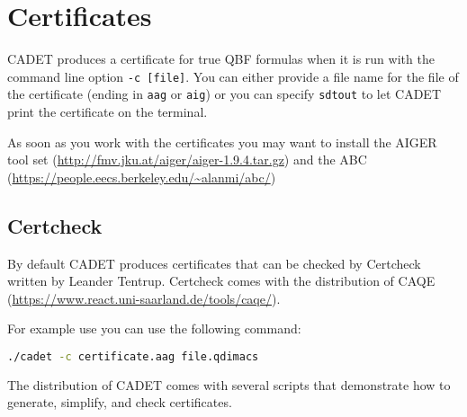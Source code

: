 \documentclass{article}
\begin{document}
%

\section{Certificates}

CADET produces a certificate for true QBF formulas when it is run with the command line option \texttt{-c [file]}. 
You can either provide a file name for the file of the certificate (ending in \texttt{aag} or \texttt{aig}) or you can specify \texttt{sdtout} to let CADET print the certificate on the terminal. 

As soon as you work with the certificates you may want to install the AIGER tool set (\url{http://fmv.jku.at/aiger/aiger-1.9.4.tar.gz}) and the ABC (\url{https://people.eecs.berkeley.edu/~alanmi/abc/})

\subsection{Certcheck}
By default CADET produces certificates that can be checked by Certcheck written by Leander Tentrup. 
Certcheck comes with the distribution of CAQE (\url{https://www.react.uni-saarland.de/tools/caqe/}). 

For example use you can use the following command:
\begin{lstlisting}[language = bash,
				   basicstyle=\footnotesize\ttfamily,
                   xleftmargin = 1cm,
                   framexleftmargin = 1em]
./cadet -c certificate.aag file.qdimacs
\end{lstlisting}

The distribution of CADET comes with several scripts that demonstrate how to generate, simplify, and check certificates. 
\end{document}
